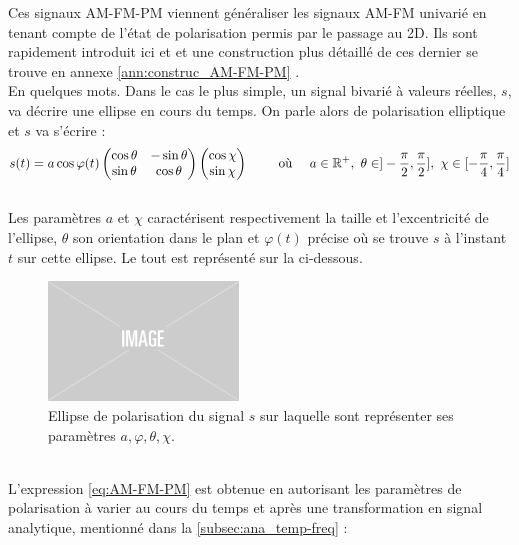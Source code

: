Ces signaux AM-FM-PM viennent généraliser les signaux AM-FM univarié en tenant compte de l'état de polarisation permis par le passage au 2D. Ils sont rapidement introduit ici et et une construction plus détaillé de ces dernier se trouve en annexe \ref{ann:construc_AM-FM-PM} .
\\
En quelques mots. Dans le cas le plus simple, un signal bivarié à valeurs réelles, $s$, va décrire une ellipse en cours du temps. 
On parle alors de polarisation elliptique et $s$ va s'écrire :
\[s(t) = a \cos\varphi(t) \begin{pmatrix} \cos\theta & -\sin\theta \\ \sin\theta  &  \cos\theta \end{pmatrix} \begin{pmatrix} \cos\chi \\ \sin\chi \end{pmatrix}  \qquad \text{ où }\quad  a\in\mathbb{R}^+,\ \theta \in ]-\frac{\pi}{2}, \frac{\pi}{2}],\ \chi \in [-\frac{\pi}{4}, \frac{\pi}{4}] \]
\\
Les paramètres $a$ et $\chi$ caractérisent respectivement la taille et l'excentricité de l'ellipse, $\theta$ son orientation dans le plan et $\varphi(t)$ précise où se trouve $s$ à l'instant $t$ sur cette ellipse. 
Le tout est représenté sur la  ci-dessous.
\begin{figure}[h]
	\includegraphics[width=0.45\textwidth]{fig/placeholder}
	\caption[Ellipse de polarisation d'un signal bivarié réel]{Ellipse de polarisation du signal $s$ sur laquelle sont représenter ses paramètres $a,\varphi,\theta,\chi$.}
	\label{fig:ellipse2polat}
\end{figure}
\\
L'expression \eqref{eq:AM-FM-PM} est obtenue en autorisant les paramètres de polarisation à varier au cours du temps et après une transformation en signal analytique, mentionné dans la \cref{subsec:ana_temp-freq} :
\\
